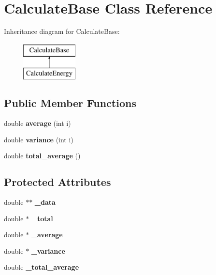 \hypertarget{class_calculate_base}{}\section{Calculate\+Base Class Reference}
\label{class_calculate_base}
Inheritance diagram for Calculate\+Base\+:\begin{figure}[H]
\begin{center}
\leavevmode
\includegraphics[height=2.000000cm]{class_calculate_base}
\end{center}
\end{figure}
\subsection*{Public Member Functions}
\begin{DoxyCompactItemize}
\item 
\mbox{\label{class_calculate_base_a4b3589297b24aa0dfde7e1b0c4f71300}} 
double {\bfseries average} (int i)
\item 
\mbox{\label{class_calculate_base_a5488d1de75b90da12080c795af284b2d}} 
double {\bfseries variance} (int i)
\item 
\mbox{\label{class_calculate_base_a844f4d0e39795bcea7743c74e2fec224}} 
double {\bfseries total\+\_\+average} ()
\end{DoxyCompactItemize}
\subsection*{Protected Attributes}
\begin{DoxyCompactItemize}
\item 
\mbox{\label{class_calculate_base_ae77ed832e35fb46ae64baec24a9ff359}} 
double $\ast$$\ast$ {\bfseries \+\_\+data}
\item 
\mbox{\label{class_calculate_base_a736de31fa14cadd5466531506be981b5}} 
double $\ast$ {\bfseries \+\_\+total}
\item 
\mbox{\label{class_calculate_base_a5ceb49ac1bef2197f9fbab8d5a421c3b}} 
double $\ast$ {\bfseries \+\_\+average}
\item 
\mbox{\label{class_calculate_base_a04805fcade234d0400b47c76727aec3b}} 
double $\ast$ {\bfseries \+\_\+variance}
\item 
\mbox{\label{class_calculate_base_a1c336116045b19865fa872d89e4b1b6b}} 
double {\bfseries \+\_\+total\+\_\+average}
\end{DoxyCompactItemize}


